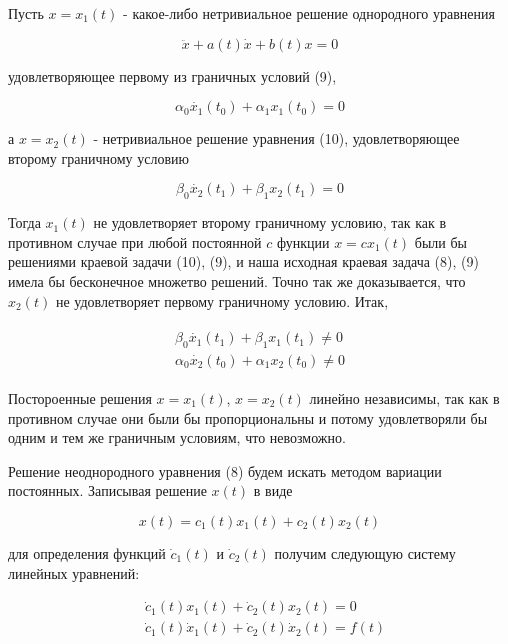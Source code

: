 \documentclass{article}
\theoremstyle{plain} \newtheorem*{theorem*}{Теорема}
\theoremstyle{plain} \newtheorem{theorem}{Теорема}[section]
\theoremstyle{defintition} \newtheorem*{corollary*}{Следствие}
\theoremstyle{plain} \newtheorem*{example*}{Пример}
\theoremstyle{plain} \newtheorem*{remark*}{Замечание}
\begin{document}
Пусть $x = x_1(t)$ - какое-либо нетривиальное решение
однородного уравнения

\begin{equation}
    \ddot{x} + a(t) \dot{x} + b(t)x = 0
\end{equation}

удовлетворяющее первому из граничных условий (9),

\begin{equation*}
    \alpha_0 \dot{x_1}(t_0) + \alpha_1 x_1(t_0) = 0
\end{equation*}

а $x = x_2(t)$ - нетривиальное решение уравнения (10),
удовлетворяющее второму граничному условию

\begin{equation*}
    \beta_0 \dot{x_2}(t_1) + \beta_1 x_2(t_1) = 0
\end{equation*}

Тогда $x_1(t)$ не удовлетворяет второму граничному условию,
так как в противном случае при любой постоянной $c$
функции $x = c x_1(t)$ были бы решениями краевой задачи (10),
(9), и наша исходная краевая задача (8), (9) имела бы
бесконечное множетво решений. Точно так же доказывается, что
$x_2(t)$ не удовлетворяет первому граничному условию. Итак,

\begin{gather}
    \begin{split}
    \beta_0 \dot{x_1}(t_1) + \beta_1 x_1(t_1) \ne 0 \\
    \alpha_0 \dot{x_2}(t_0) + \alpha_1 x_2(t_0) \ne 0
    \end{split}
\end{gather}

Постороенные решения $x = x_1(t)$, $x = x_2(t)$ линейно
независимы, так как в противном случае они были бы
пропорциональны и потому удовлетворяли бы одним и тем же
граничным условиям, что невозможно.

Решение неоднородного уравнения (8) будем искать
методом вариации постоянных. Записывая решение $x(t)$
в виде

\begin{equation}
    x(t) = c_1(t) x_1(t) + c_2(t) x_2(t)
\end{equation}

для определения функций $\dot{c}_1(t)$ и $\dot{c}_2(t)$
получим следующую систему линейных уравнений:

\begin{align*}
    & \dot{c}_1(t) x_1(t) + \dot{c}_2(t) x_2(t) = 0 \\
    & \dot{c}_1(t) \dot{x}_1(t) + \dot{c}_2(t) \dot{x}_2(t) = f(t)
\end{align*}
\end{document}
